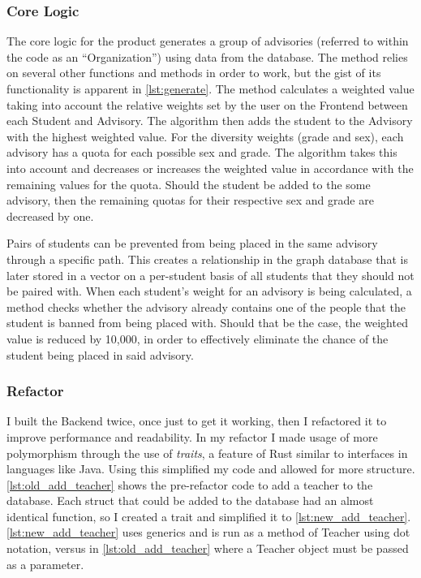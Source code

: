 \documentclass[advisory-ia.tex]{subfiles}
\begin{document}
  \subsubsection{Core Logic}
  The core logic for the product generates a group of advisories (referred to within the code as an \enquote{Organization}) using data from the database.
  The method relies on several other functions and methods in order to work, but the gist of its functionality is apparent in \cref{lst:generate}.
  The method calculates a weighted value taking into account the relative weights set by the user on the Frontend between each Student and Advisory.
  The algorithm then adds the student to the Advisory with the highest weighted value.
  For the diversity weights (grade and sex), each advisory has a quota for each possible sex and grade.
  The algorithm takes this into account and decreases or increases the weighted value in accordance with the remaining values for the quota.
  Should the student be added to the some advisory, then the remaining quotas for their respective sex and grade are decreased by one.

  Pairs of students can be prevented from being placed in the same advisory through a specific path.
  This creates a relationship in the graph database that is later stored in a vector on a per-student basis of all students that they should not be paired with.
  When each student's weight for an advisory is being calculated, a method checks whether the advisory already contains one of the people that the student is banned from being placed with.
  Should that be the case, the weighted value is reduced by 10,000, in order to effectively eliminate the chance of the student being placed in said advisory.

  

  \subsubsection{Refactor}
  I built the Backend twice, once just to get it working, then I refactored it to improve performance and readability.
  In my refactor I made usage of more polymorphism through the use of \emph{traits}, a feature of Rust similar to interfaces in languages like Java.
  Using this simplified my code and allowed for more structure.
  \cref{lst:old_add_teacher} shows the pre-refactor code to add a teacher to the database.
  Each struct that could be added to the database had an almost identical function, so I created a trait and simplified it to \cref{lst:new_add_teacher}.
  \cref{lst:new_add_teacher} uses generics and is run as a method of Teacher using dot notation, versus in \cref{lst:old_add_teacher} where a Teacher object must be passed as a parameter.
\end{document}
